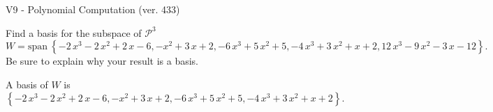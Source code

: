 \begin{exercise}
  \begin{exerciseTitle}V9 - Polynomial Computation (ver. 433)\end{exerciseTitle}
  \begin{exerciseStatement}
    Find a basis for the subspace of \(\mathcal{P}^3\) 
\[W=\mathrm{span}\ \left\{-2 \, x^{3} - 2 \, x^{2} + 2 \, x - 6 , -x^{2} + 3 \, x + 2 , -6 \, x^{3} + 5 \, x^{2} + 5 , -4 \, x^{3} + 3 \, x^{2} + x + 2 , 12 \, x^{3} - 9 \, x^{2} - 3 \, x - 12\right\}.\]
 Be sure to explain why your result is a basis.


  \end{exerciseStatement}
  \begin{exerciseAnswer}
   A basis of \(W\) is  \(\left\{-2 \, x^{3} - 2 \, x^{2} + 2 \, x - 6 , -x^{2} + 3 \, x + 2 , -6 \, x^{3} + 5 \, x^{2} + 5 , -4 \, x^{3} + 3 \, x^{2} + x + 2\right\}\).
  


  \end{exerciseAnswer}
\end{exercise}